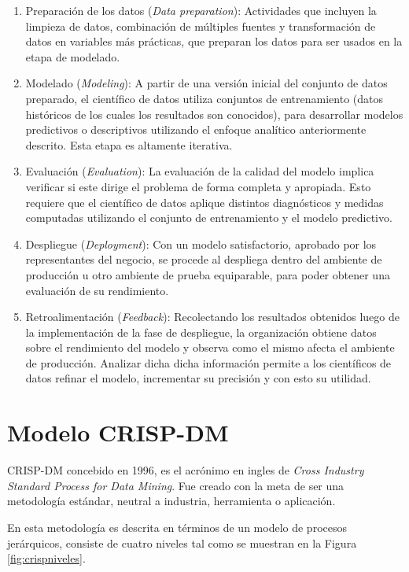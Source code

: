 \begin{enumerate}
        \item Preparación de los datos (\emph{Data preparation}): Actividades que incluyen la limpieza de datos, combinación de múltiples fuentes y transformación de datos en variables más prácticas, que preparan los datos para ser usados en la etapa de  modelado.
        \item Modelado (\emph{Modeling}): A partir de una versión inicial del conjunto de datos preparado, el científico de datos utiliza conjuntos de entrenamiento (datos históricos de los cuales los resultados son conocidos), para desarrollar modelos predictivos o descriptivos utilizando el enfoque analítico anteriormente descrito. Esta etapa es altamente iterativa.
        \item Evaluación (\emph{Evaluation}): La evaluación de la calidad del modelo implica verificar si este
        dirige el problema de forma completa y apropiada. Esto requiere que el científico de datos aplique distintos diagnósticos y medidas computadas utilizando el conjunto de entrenamiento y el modelo predictivo.
        \item Despliegue (\emph{Deployment}): Con un modelo satisfactorio, aprobado por los representantes del negocio, se procede al despliega dentro del ambiente de producción u otro ambiente de prueba equiparable, para poder obtener una evaluación de su rendimiento.
        \item Retroalimentación (\emph{Feedback}): Recolectando los resultados obtenidos luego de la implementación de la fase de despliegue, la organización obtiene datos sobre el rendimiento del modelo y observa como el mismo afecta el ambiente de producción. Analizar dicha dicha información permite a los científicos de datos refinar el modelo, incrementar su precisión y con esto su utilidad.
    \end{enumerate}

\section{Modelo CRISP-DM}

CRISP-DM concebido en 1996, es el acrónimo en ingles de \textit{Cross Industry Standard Process for Data Mining}. Fue creado con la meta de ser una metodología estándar, neutral a industria, herramienta o aplicación.\cite{chapman2000crisp}


En \cite{chapman2000crisp} esta metodología es descrita en términos de un modelo de procesos jerárquicos, consiste de cuatro niveles tal como se muestran en la Figura \ref{fig:crispniveles}.

